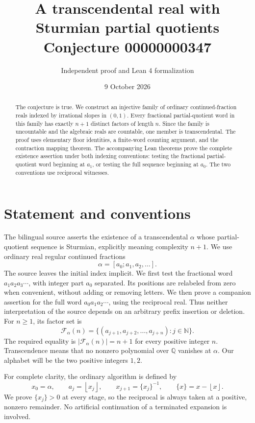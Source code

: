 \documentclass[11pt]{article}
\title{A transcendental real with Sturmian partial quotients\\\large Conjecture 00000000347}
\author{Independent proof and Lean 4 formalization}
\date{9 October 2026}
\newcommand{\Q}{\mathbb Q}
\newcommand{\N}{\mathbb N}
\newcommand{\floor}[1]{\left\lfloor #1\right\rfloor}
\begin{document}
\maketitle

\begin{abstract}
The conjecture is true. We construct an injective family of ordinary continued-fraction reals indexed by irrational slopes in $(0,1)$. Every fractional partial-quotient word in this family has exactly $n+1$ distinct factors of length $n$. Since the family is uncountable and the algebraic reals are countable, one member is transcendental. The proof uses elementary floor identities, a finite-word counting argument, and the contraction mapping theorem. The accompanying Lean theorems prove the complete existence assertion under both indexing conventions: testing the fractional partial-quotient word beginning at $a_1$, or testing the full sequence beginning at $a_0$. The two conventions use reciprocal witnesses.
\end{abstract}

\section{Statement and conventions}
The bilingual source asserts the existence of a transcendental $\alpha$ whose partial-quotient sequence is Sturmian, explicitly meaning complexity $n+1$. We use ordinary real regular continued fractions
\[
 \alpha=[a_0;a_1,a_2,\ldots].
\]
The source leaves the initial index implicit. We first test the fractional word $a_1a_2a_3\cdots$, with integer part $a_0$ separated. Its positions are relabeled from zero when convenient, without adding or removing letters. We then prove a companion assertion for the full word $a_0a_1a_2\cdots$, using the reciprocal real. Thus neither interpretation of the source depends on an arbitrary prefix insertion or deletion. For $n\geq1$, its factor set is
\[
 \mathcal F_\alpha(n)=
 \{(a_{j+1},a_{j+2},\ldots,a_{j+n}):j\in\N\}.
\]
The required equality is $|\mathcal F_\alpha(n)|=n+1$ for every positive integer $n$. Transcendence means that no nonzero polynomial over $\Q$ vanishes at $\alpha$. Our alphabet will be the two positive integers $1,2$.

For complete clarity, the ordinary algorithm is defined by
\[
 x_0=\alpha,\qquad a_j=\floor{x_j},\qquad
 x_{j+1}=\{x_j\}^{-1},\qquad \{x\}=x-\floor{x}.
\]
We prove $\{x_j\}>0$ at every stage, so the reciprocal is always taken at a positive, nonzero remainder. No artificial continuation of a terminated expansion is involved.
\end{document}
